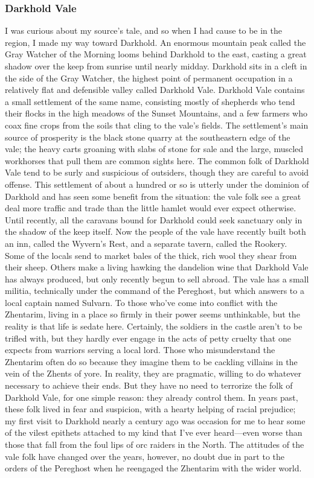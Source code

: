 \documentclass[10pt,a4paper,twoside,twocolumn,openany,bg=print,nodeprecatedcode]{dndbook}
\begin{document}
\subsubsection{Darkhold Vale}
I was curious about my source's tale, and so when I had cause to be in the region, I made my way toward Darkhold. An enormous mountain peak called the Gray Watcher of the Morning looms behind Darkhold to the east, casting a great shadow over the keep from sunrise until nearly midday. Darkhold sits in a cleft in the side of the Gray Watcher, the highest point of permanent occupation in a relatively flat and defensible valley called Darkhold Vale.
Darkhold Vale contains a small settlement of the same name, consisting mostly of shepherds who tend their flocks in the high meadows of the Sunset Mountains, and a few farmers who coax fine crops from the soils that cling to the vale's fields. The settlement's main source of prosperity is the black stone quarry at the southeastern edge of the vale; the heavy carts groaning with slabs of stone for sale and the large, muscled workhorses that pull them are common sights here. The common folk of Darkhold Vale tend to be surly and suspicious of outsiders, though they are careful to avoid offense.
This settlement of about a hundred or so is utterly under the dominion of Darkhold and has seen some benefit from the situation: the vale folk see a great deal more traffic and trade than the little hamlet would ever expect otherwise. Until recently, all the caravans bound for Darkhold could seek sanctuary only in the shadow of the keep itself. Now the people of the vale have recently built both an inn, called the Wyvern's Rest, and a separate tavern, called the Rookery.
Some of the locals send to market bales of the thick, rich wool they shear from their sheep. Others make a living hawking the dandelion wine that Darkhold Vale has always produced, but only recently begun to sell abroad. The vale has a small militia, technically under the command of the Pereghost, but which answers to a local captain named Sulvarn.
To those who've come into conflict with the Zhentarim, living in a place so firmly in their power seems unthinkable, but the reality is that life is sedate here. Certainly, the soldiers in the castle aren't to be trifled with, but they hardly ever engage in the acts of petty cruelty that one expects from warriors serving a local lord. Those who misunderstand the Zhentarim often do so because they imagine them to be cackling villains in the vein of the Zhents of yore. In reality, they are pragmatic, willing to do whatever necessary to achieve their ends. But they have no need to terrorize the folk of Darkhold Vale, for one simple reason: they already control them.
In years past, these folk lived in fear and suspicion, with a hearty helping of racial prejudice; my first visit to Darkhold nearly a century ago was occasion for me to hear some of the vilest epithets attached to my kind that I've ever heard—even worse than those that fall from the foul lips of orc raiders in the North. The attitudes of the vale folk have changed over the years, however, no doubt due in part to the orders of the Pereghost when he reengaged the Zhentarim with the wider world.
\end{document}
